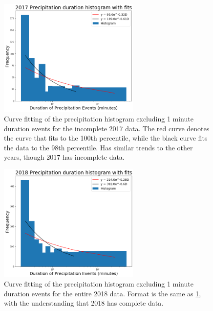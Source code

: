 \documentclass[11pt]{report}
\begin{document}
\clearpage
\begin{figure}[t]
\centering
\includegraphics[width=0.625\textwidth]{Figures/precip17_new.png}
\caption[2017 precipitation duration exponentials with contrasting curve fitting]
{\label{precip17_redone}Curve fitting of the precipitation histogram
  excluding 1 minute duration events for the incomplete 2017 data. The red
  curve denotes the curve that fits to the 100th percentile, while the black
  curve fits the data to the 98th percentile. Has similar trends to the
  other years, though 2017 has incomplete data.}
\end{figure}

\begin{figure}[b]
\centering
\includegraphics[width=0.625\textwidth]{Figures/precip18_new.png}
\caption[2018 precipitation duration exponentials with contrasting curve fitting]
{\label{precip18_redone}Curve fitting of the precipitation histogram
  excluding 1 minute duration events for the entire 2018 data. Format is the
  same as \ref{precip17_redone}, with the understanding that 2018 has
  complete data.}
\end{figure}

\clearpage
\end{document}
